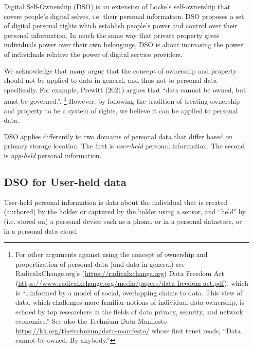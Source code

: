 \documentclass[11pt, oneside]{article}   	%
\begin{document}
Digital Self-Ownership (DSO) is an extension of Locke's self-ownership that covers people's digital selves, i.e. their personal information. DSO proposes a set of digital personal rights which establish people's power and control over their personal information. In much the same way that private property gives individuals power over their own belongings, DSO is about increasing the power of individuals relative the power of digital service providers. 

We acknowledge that many argue that the concept of ownership and property should not be applied to data in general, and thus not to personal data specifically. For example, Prewitt (2021) argues that “data cannot be owned, but must be governed.”\cite{Prewitt2021}. \footnote{For other arguments against using the concept of ownership and propertization of personal data (and data in general) see RadicalxChange.org's (\url{https://radicalxchange.org}) Data Freedom Act (\url{https://www.radicalxchange.org/media/papers/data-freedom-act.pdf}), which is “…informed by a model of social, overlapping claims to data. This view of data, which challenges more familiar notions of individual data ownership, is echoed by top researchers in the fields of data privacy, security, and network economics.” See also the Technium Data Manifesto \url{https://kk.org/thetechnium/data-manifesto/} whose first tenet reads, “Data cannot be owned. By anybody.”} However, by following the tradition of treating ownership and property to be a system of rights, we believe it can be applied to personal data.  

DSO applies differently to two domains of personal data that differ based on primary storage location. The first is \emph{user-held}\cite{Jurcys2021} personal information. The second is \emph{app-held} personal information. 

\subsection{DSO for User-held data}

User-held personal information is data about the individual that is created (authored) by the holder or captured by the holder using a sensor, and ``held" by (i.e. stored on) a personal device such as a phone, or in a personal datastore, or in a personal data cloud. 
\end{document}
